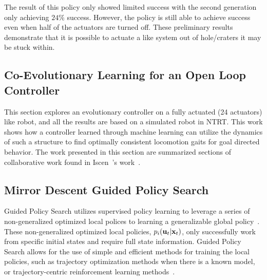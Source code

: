 The result of this policy only showed limited success with the second generation only achieving \(24\%\) success.
However, the policy is still able to achieve success even when half of the actuators are turned off.
These preliminary results demonstrate that it is possible to actuate a \SB{} like system out of hole/craters it may be stuck within.


\subsection{Co-Evolutionary Learning for an Open Loop Controller}
\label{sec:openLoopControl}
This section explores an evolutionary controller on a fully actuated (24 actuators) \SB{} like robot, and all the results are based on a simulated robot in NTRT.
This work shows how a controller learned through machine learning can utilize the dynamics of such a structure to find optimally consistent locomotion gaits for goal directed behavior.
The work presented in this section are summarized sections of collaborative work found in Iscen~\etal's work~\cite{iscen2015learning}.



\subsection{Mirror Descent Guided Policy Search}
\label{sec:mdgps}

Guided Policy Search utilizes supervised policy learning to leverage a series of non-generalized optimized local polices to learning a generalizable global policy~\cite{lk-gps-13}.
These non-generalized optimized local policies, $p_i(\mathbf{u}_t|\mathbf{x}_t)$, only successfully work from specific initial states and require full state information.
Guided Policy Search allows for the use of simple and efficient methods for training the local policies,
such as trajectory optimization methods when there is a known model, or
trajectory-centric reinforcement learning methods~\cite{la-lnnpg-14}.

